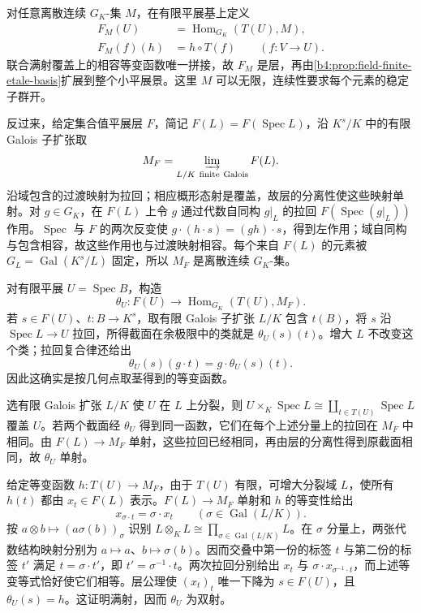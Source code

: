 \ProseParagraphBreak
对任意离散连续 \(G_K\)-集 \(M\)，在有限平展基上定义
\[
	\begin{aligned}
		F_M(U)&=\operatorname{Hom}_{G_K}(T(U),M),\\
		F_M(f)(h)&=h\circ T(f)\qquad(f:V\rightarrow U).
	\end{aligned}
\]
联合满射覆盖上的相容等变函数唯一拼接，故 \(F_M\) 是层，再由\cref{b4:prop:field-finite-etale-basis}扩展到整个小平展景。这里 \(M\) 可以无限，连续性要求每个元素的稳定子群开。

\ProseParagraphBreak
反过来，给定集合值平展层 \(F\)，简记 \(F(L)=F(\operatorname{Spec}L)\)，沿 \(K^s/K\) 中的有限 Galois 子扩张取
\[
	M_F=\varinjlim_{L/K\ {\rm finite\ Galois}}F(L).
\]
沿域包含的过渡映射为拉回；相应概形态射是覆盖，故层的分离性使这些映射单射。对 \(g\in G_K\)，在 \(F(L)\) 上令 \(g\) 通过代数自同构 \(g|_L\) 的拉回 \(F(\operatorname{Spec}(g|_L))\) 作用。\(\operatorname{Spec}\) 与 \(F\) 的两次反变使 \(g\cdot(h\cdot s)=(gh)\cdot s\)，得到左作用；域自同构与包含相容，故这些作用也与过渡映射相容。每个来自 \(F(L)\) 的元素被 \(G_L=\operatorname{Gal}(K^s/L)\) 固定，所以 \(M_F\) 是离散连续 \(G_K\)-集。

\ProseParagraphBreak
对有限平展 \(U=\operatorname{Spec}B\)，构造
\[
	\theta_U:F(U)\longrightarrow \operatorname{Hom}_{G_K}(T(U),M_F).
\]
若 \(s\in F(U)\)、\(t:B\rightarrow K^s\)，取有限 Galois 子扩张 \(L/K\) 包含 \(t(B)\)，将 \(s\) 沿 \(\operatorname{Spec}L\rightarrow U\) 拉回，所得截面在余极限中的类就是 \(\theta_U(s)(t)\)。增大 \(L\) 不改变这个类；拉回复合律还给出
\[
	\theta_U(s)(g\cdot t)=g\cdot\theta_U(s)(t).
\]
因此这确实是按几何点取茎得到的等变函数。

\ProseParagraphBreak
选有限 Galois 扩张 \(L/K\) 使 \(U\) 在 \(L\) 上分裂，则 \(U\times_K\operatorname{Spec}L\cong\coprod_{t\in T(U)}\operatorname{Spec}L\) 覆盖 \(U\)。若两个截面经 \(\theta_U\) 得到同一函数，它们在每个上述分量上的拉回在 \(M_F\) 中相同。由 \(F(L)\rightarrow M_F\) 单射，这些拉回已经相同，再由层的分离性得到原截面相同，故 \(\theta_U\) 单射。

\ProseParagraphBreak
给定等变函数 \(h:T(U)\rightarrow M_F\)，由于 \(T(U)\) 有限，可增大分裂域 \(L\)，使所有 \(h(t)\) 都由 \(x_t\in F(L)\) 表示。\(F(L)\rightarrow M_F\) 单射和 \(h\) 的等变性给出
\[
	x_{\sigma\cdot t}=\sigma\cdot x_t \qquad(\sigma\in\operatorname{Gal}(L/K)).
\]
按 \(a\otimes b\mapsto(a\sigma(b))_\sigma\) 识别 \(L\otimes_KL\cong\prod_{\sigma\in\operatorname{Gal}(L/K)}L\)。在 \(\sigma\) 分量上，两张代数结构映射分别为 \(a\mapsto a\)、\(b\mapsto\sigma(b)\)。因而交叠中第一份的标签 \(t\) 与第二份的标签 \(t'\) 满足 \(t=\sigma\cdot t'\)，即 \(t'=\sigma^{-1}\cdot t\)。两次拉回分别给出 \(x_t\) 与 \(\sigma\cdot x_{\sigma^{-1}\cdot t}\)，而上述等变等式恰好使它们相等。层公理使 \((x_t)_t\) 唯一下降为 \(s\in F(U)\)，且 \(\theta_U(s)=h\)。这证明满射，因而 \(\theta_U\) 为双射。

